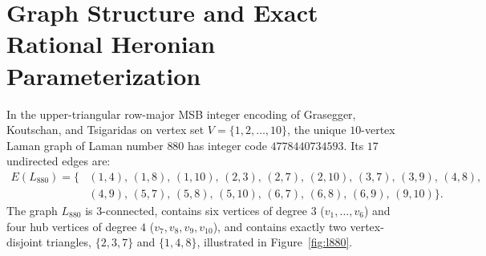 \documentclass[11pt,a4paper]{article}
\theoremstyle{definition}
\theoremstyle{remark}
\begin{document}
\begin{table}[!htbp]
\centering
\caption{Comparison of real realization lower bounds and asymptotic planar fan growth bases.}
\label{tab:comparison}
\end{table}

\section{Graph Structure and Exact Rational Heronian Parameterization}

In the upper-triangular row-major MSB integer encoding of Grasegger, Koutschan, and Tsigaridas \cite[Table~8]{GKT20} on vertex set $V = \{1,2,\dots,10\}$, the unique $10$-vertex Laman graph of Laman number $880$ has integer code $4778440734593$. Its $17$ undirected edges are:
\begin{equation}\label{eq:edges}
\begin{aligned}
E(L_{880}) = \{&(1,4),\,(1,8),\,(1,10),\,(2,3),\,(2,7),\,(2,10),\,(3,7),\,(3,9),\,(4,8),\\
&(4,9),\,(5,7),\,(5,8),\,(5,10),\,(6,7),\,(6,8),\,(6,9),\,(9,10)\}.
\end{aligned}
\end{equation}
The graph $L_{880}$ is $3$-connected, contains six vertices of degree $3$ ($v_1,\dots,v_6$) and four hub vertices of degree $4$ ($v_7,v_8,v_9,v_{10}$), and contains exactly two vertex-disjoint triangles, $\{2,3,7\}$ and $\{1,4,8\}$, illustrated in Figure~\ref{fig:l880}.
\end{document}
